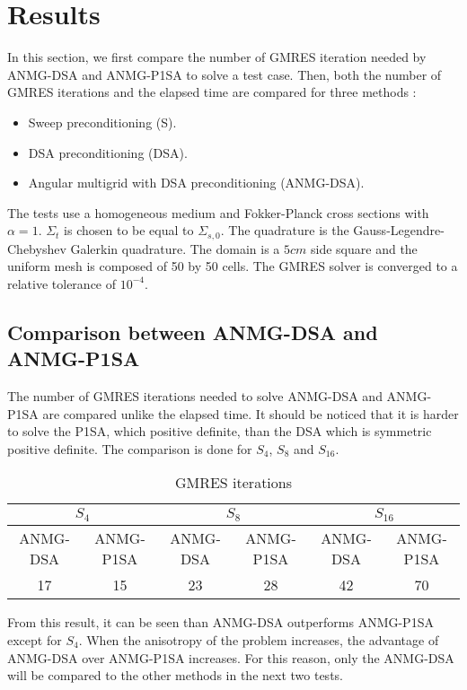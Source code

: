 \section{Results}
In this section, we first compare the number of GMRES iteration needed by 
ANMG-DSA and ANMG-P1SA to solve a test case. Then, both the number of GMRES 
iterations and the elapsed time are compared for three methods :
\begin{itemize}
\item Sweep preconditioning (S).
\item DSA preconditioning (DSA).
\item Angular multigrid with DSA preconditioning (ANMG-DSA).
\end{itemize}
The tests use a homogeneous medium and Fokker-Planck cross
sections with $\alpha=1$. $\Sigma_{t}$ is chosen to be equal to
$\Sigma_{s,0}$. The quadrature is the Gauss-Legendre-Chebyshev Galerkin
quadrature. The domain is a $5cm$ side square and the uniform mesh is composed
of 50 by 50 
cells. The GMRES solver is converged to a relative tolerance of $10^{-4}$.
\subsection{Comparison between ANMG-DSA and ANMG-P1SA}
The number of GMRES iterations needed to solve ANMG-DSA and
ANMG-P1SA are compared unlike the elapsed time. It should be noticed that it is
harder to solve the P1SA, which positive definite, than the DSA which is
symmetric positive definite. The comparison is done for $S_4$, $S_8$ and
$S_{16}$. 
\begin{table}[H]
\begin{center}
\begin{tabular}{|c|c|c|c|c|c|}
\hline
\multicolumn{2}{|c|}{$S_4$} & \multicolumn{2}{c|}{$S_8$} &
\multicolumn{2}{c|}{$S_{16}$}\\
\hline
ANMG-DSA & ANMG-P1SA & ANMG-DSA & ANMG-P1SA & ANMG-DSA & ANMG-P1SA\\
\hline
17 &  15 & 23 & 28 & 42 & 70\\
\hline
\end{tabular}
\caption{GMRES iterations}
\end{center}
\end{table}
From this result, it can be seen than ANMG-DSA outperforms ANMG-P1SA except for
$S_4$. When the anisotropy of the problem increases, the advantage of ANMG-DSA
over ANMG-P1SA increases. For this reason, only the ANMG-DSA will be compared
to the other methods in the next two tests.
